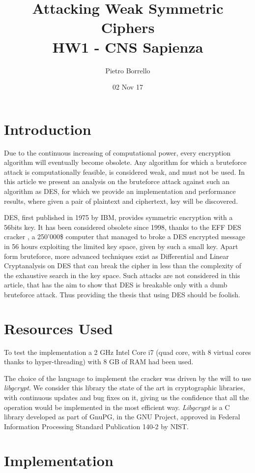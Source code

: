 \documentclass[11pt]{article}
\title{Attacking Weak Symmetric Ciphers \\ \bigskip \large HW1 - CNS Sapienza}
\author{Pietro Borrello}
\date{02 Nov 17}
\begin{document}
  \maketitle

  \section{Introduction}
  Due to the continuous increasing of computational power, every encryption algorithm will eventually become obsolete.
  Any algorithm for which a bruteforce attack is computationally feasible, is considered weak, and must not be used. In this article we present an analysis on the bruteforce attack against such an algorithm as DES, for which we provide an implementation and performance results, where given a pair of plaintext and ciphertext, key will be discovered.

  DES, first published in 1975 by IBM, provides symmetric encryption with a 56bits key. It has been considered obsolete since 1998, thanks to the EFF DES cracker \cite{descracker}, a 250'000\$ computer that managed to broke a DES encrypted message in 56 hours exploiting the limited key space, given by such a small key. Apart form bruteforce, more advanced techniques exist as Differential and Linear Cryptanalysis on DES \cite{cryptanalysis} that can break the cipher in less than the complexity of the exhaustive search in the key space. Such attacks are not considered in this article, that has the aim to show that DES is breakable only with a dumb bruteforce attack. Thus providing the thesis that using DES should be foolish.

  \section{Resources Used}
  To test the implementation a 2 GHz Intel Core i7 (quad core, with 8 virtual cores thanks to hyper-threading) with 8 GB of RAM had been used.

  The choice of the language to implement the cracker was driven by the will to use \textit{libgcrypt}. We consider this library the state of the art in cryptographic libraries, with continuous updates and bug fixes on it, giving us the confidence that all the operation would be implemented in the most efficient way. \textit{Libgcrypt} is a C library developed as part of GnuPG, in the GNU Project, approved in Federal Information Processing Standard Publication 140-2 by NIST.

  \section{Implementation}
\end{document}
